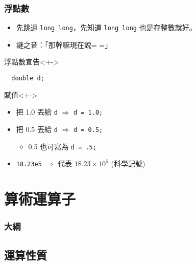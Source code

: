 \documentclass[utf8]{beamer}
\begin{document}
\begin{CJK}{UTF8}{bkai}
\begin{frame}[fragile]
  \frametitle{浮點數}
  \begin{itemize}[<+->]
    \item 先跳過 \lstinline{long long}{}，先知道 \lstinline{long long}{} 也是存整數就好。
    \item 謎之音：「那幹嘛現在說= =」
  \end{itemize}
  \begin{alertblock}{浮點數宣告}<+->
    \begin{lstlisting}
  double d;
    \end{lstlisting}
  \end{alertblock}
  \begin{exampleblock}{賦值}<+->
    \begin{itemize}
    \item 把 1.0 丟給 \lstinline{d}{} $\Rightarrow$ \lstinline{d = 1.0;}{}
    \item<+-> 把 0.5 丟給 \lstinline{d}{} $\Rightarrow$ \lstinline{d = 0.5;}{}
      \begin{itemize}[<+->]
      \item 0.5 也可寫為 \lstinline{d = .5;}{}
      \end{itemize}
    \item<+-> \lstinline{18.23e5}{} $\Rightarrow$ 代表 $18.23\times{10^5}$ (\alert{科學記號})
    \end{itemize}
  \end{exampleblock}
\end{frame}

\section{算術運算子}
\begin{frame}
  \frametitle{大綱}
  \begin{multicols}{2}
    \tableofcontents[currentsection]
  \end{multicols}
\end{frame}

\subsection{運算性質}


\end{CJK}
\end{document}
